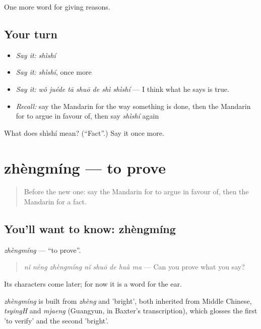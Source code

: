 \begin{grammarlens}[title={What you've built}]
One more word for giving reasons.
\end{grammarlens}

\subsection*{Your turn}
\begin{itemize}
\raggedright
  \item \emph{Say it:} \emph{shìshí}
  \item \emph{Say it:} \emph{shìshí}, once more
  \item \emph{Say it:} \emph{wǒ juéde tā shuō de shì shìshí} — I think what he says is true.
  \item \emph{Recall:} say the Mandarin for the way something is done, then the Mandarin for to argue in favour of, then say \emph{shìshí} again
\end{itemize}

\begin{tcolorbox}[breakable,colback=teal!4,colframe=teal!35!black,title={Before you move on}]
What does shìshí mean? (\textquotedblleft{}Fact\textquotedblright{}.) Say it once more.
\end{tcolorbox}
\section[zhèngmíng]{zhèngmíng — to prove}

\label{lesson:ZH-C350-zhengming}



\begin{quote}
Before the new one: say the Mandarin for to argue in favour of, then the Mandarin for a fact.
\end{quote}

\subsection*{You'll want to know: zhèngmíng}
\emph{zhèngmíng} — \textquotedblleft{}to prove\textquotedblright{}.

\begin{quote}
\emph{nǐ néng zhèngmíng nǐ shuō de huà ma} — Can you prove what you say?
\end{quote}

Its characters come later; for now it is a word for the ear.

\begin{cousinweb}
\emph{zhèngmíng} is built from \emph{zhèng} and  'bright', both inherited from Middle Chinese, \emph{tsyingH} and \emph{mjaeng} (Guangyun, in Baxter's transcription), which glosses the first 'to verify' and the second 'bright'.
\end{cousinweb}

